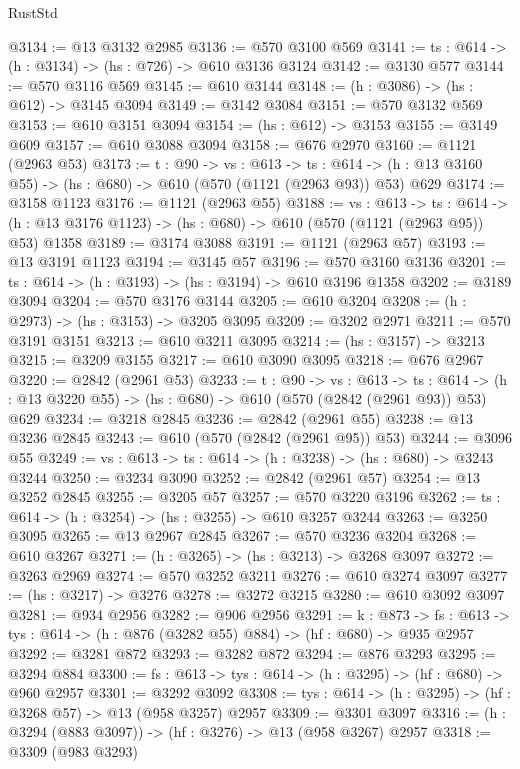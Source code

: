 \begin{lexlean}{RustStd}
\begin{coremodule}
@3134 := @13 @3132 @2985
@3136 := @570 @3100 @569
@3141 := {ts : @614} -> (h : @3134) -> (hs : @726) -> @610 @3136 @3124
@3142 := @3130 @577
@3144 := @570 @3116 @569
@3145 := @610 @3144
@3148 := (h : @3086) -> (hs : @612) -> @3145 @3094
@3149 := @3142 @3084
@3151 := @570 @3132 @569
@3153 := @610 @3151 @3094
@3154 := (hs : @612) -> @3153
@3155 := @3149 @609
@3157 := @610 @3088 @3094
@3158 := @676 @2970
@3160 := @1121 (@2963 @53)
@3173 := {t : @90} ->
  {vs : @613} ->
  {ts : @614} -> (h : @13 @3160 @55) -> (hs : @680) -> @610 (@570 (@1121 (@2963 @93)) @53) @629
@3174 := @3158 @1123
@3176 := @1121 (@2963 @55)
@3188 := {vs : @613} ->
  {ts : @614} -> (h : @13 @3176 @1123) -> (hs : @680) -> @610 (@570 (@1121 (@2963 @95)) @53) @1358
@3189 := @3174 @3088
@3191 := @1121 (@2963 @57)
@3193 := @13 @3191 @1123
@3194 := @3145 @57
@3196 := @570 @3160 @3136
@3201 := {ts : @614} -> (h : @3193) -> (hs : @3194) -> @610 @3196 @1358
@3202 := @3189 @3094
@3204 := @570 @3176 @3144
@3205 := @610 @3204
@3208 := (h : @2973) -> (hs : @3153) -> @3205 @3095
@3209 := @3202 @2971
@3211 := @570 @3191 @3151
@3213 := @610 @3211 @3095
@3214 := (hs : @3157) -> @3213
@3215 := @3209 @3155
@3217 := @610 @3090 @3095
@3218 := @676 @2967
@3220 := @2842 (@2961 @53)
@3233 := {t : @90} ->
  {vs : @613} ->
  {ts : @614} -> (h : @13 @3220 @55) -> (hs : @680) -> @610 (@570 (@2842 (@2961 @93)) @53) @629
@3234 := @3218 @2845
@3236 := @2842 (@2961 @55)
@3238 := @13 @3236 @2845
@3243 := @610 (@570 (@2842 (@2961 @95)) @53)
@3244 := @3096 @55
@3249 := {vs : @613} -> {ts : @614} -> (h : @3238) -> (hs : @680) -> @3243 @3244
@3250 := @3234 @3090
@3252 := @2842 (@2961 @57)
@3254 := @13 @3252 @2845
@3255 := @3205 @57
@3257 := @570 @3220 @3196
@3262 := {ts : @614} -> (h : @3254) -> (hs : @3255) -> @610 @3257 @3244
@3263 := @3250 @3095
@3265 := @13 @2967 @2845
@3267 := @570 @3236 @3204
@3268 := @610 @3267
@3271 := (h : @3265) -> (hs : @3213) -> @3268 @3097
@3272 := @3263 @2969
@3274 := @570 @3252 @3211
@3276 := @610 @3274 @3097
@3277 := (hs : @3217) -> @3276
@3278 := @3272 @3215
@3280 := @610 @3092 @3097
@3281 := @934 @2956
@3282 := @906 @2956
@3291 := {k : @873} ->
  {fs : @613} -> {tys : @614} -> (h : @876 (@3282 @55) @884) -> (hf : @680) -> @935 @2957
@3292 := @3281 @872
@3293 := @3282 @872
@3294 := @876 @3293
@3295 := @3294 @884
@3300 := {fs : @613} -> {tys : @614} -> (h : @3295) -> (hf : @680) -> @960 @2957
@3301 := @3292 @3092
@3308 := {tys : @614} -> (h : @3295) -> (hf : @3268 @57) -> @13 (@958 @3257) @2957
@3309 := @3301 @3097
@3316 := (h : @3294 (@883 @3097)) -> (hf : @3276) -> @13 (@958 @3267) @2957
@3318 := @3309 (@983 @3293)

\end{coremodule}
\end{lexlean}
